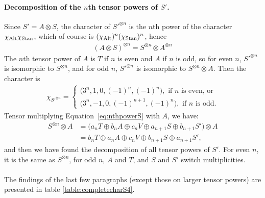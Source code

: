 \begin{example}
	\paragraph{Decomposition of the $n$th tensor powers of $S'$.} Since $S' = A \otimes S$, the character of $S'^{\otimes n}$ is the $n$th power of the character $\chi_{\text{Alt}} \chi_{\text{Stan}}$, which of course is $(\chi_{\text{Alt}})^n(\chi_{\text{Stan}})^n$, hence%
	\begin{align*}
		(A \otimes S)^{\otimes n} = S^{\otimes n} \otimes A^{\otimes n}
	\end{align*}
	The $n$th tensor power of $A$ is $T$ if $n$ is even and $A$ if $n$ is odd, so for even $n$, $S'^{\otimes n}$ is isomorphic to $S^{\otimes n}$, and for odd $n$, $S'^{\otimes n}$ is isomorphic to $ S^{\otimes n} \otimes A$. Then the character is 
	\begin{align*}
		\chi_{S'^{\otimes n}} = \begin{cases}
			\big(3^n,1,0,(-1)^{n}, (-1)^n\big), \text{ if } n \text{ is even, or} \\
			\big(3^n,-1,0,(-1)^{n+1}, (-1)^n\big), \text{ if } n \text{ is odd.}
		\end{cases}
	\end{align*}
	Tensor multiplying Equation~\ref{eq:nthpowerS} with $A$, we have:
	\begin{align*}
		S^{\otimes n} \otimes A &= \Big(a_n T \oplus b_n A \oplus c_n V \oplus a_{n+1} S \oplus b_{n+1} S'\Big)\otimes A \\
		&= b_n T \oplus a_n A \oplus c_n V \oplus b_{n+1} S \oplus a_{n+1} S',
	\end{align*}
	and then we have found the decomposition of all tensor powers of $S'$. For even $n$, it is the same as $S^{\otimes n}$, for odd $n$, $A$ and $T$, and $S$ and $S'$ switch multiplicities.
	
	\paragraph{} The findings of the last few paragraphs (except those on larger tensor powers) are presented in table \ref{table:completecharS4}.
	

\end{example}

